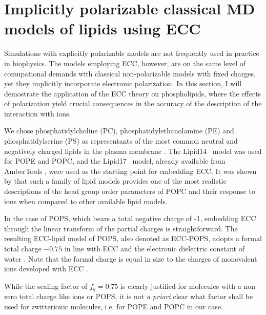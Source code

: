  

 
 



\section{Implicitly polarizable classical MD models of lipids using ECC}
\label{section:ecc-lipids}

Simulations with explicitly polarizable models are not frequently used in practice in biophysics. 
The models employing ECC, however, are on the same level of comupational demands with classical non-polarizable models with fixed charges, yet they implicitly incorporate electronic polarization. 
In this section, I will demostrate the application of the ECC theory on phospholipids, 
where the effects of polarization yield crucial consequences in the accuracy of the description of the interaction with ions. 

We chose phosphatidylcholine (PC), phosphatidylethanolamine (PE) and phosphatidylserine (PS)
as representants of the most common neutral and negatively charged lipids in the plasma membrane \citep{the_review_with_pie_charts_on_my_desk, marsh13}. 
The Lipid14~\citep{dickson14} model was used for POPE and POPC,
and the Lipid17~\citep{lipid17} model, already available from AmberTools \citep{ferrer13},
were used as the starting point for embedding ECC.
It was shown by \citet{botan15, catte16} that such a family of lipid models provides one of the most 
realistic descriptions of the head group order parameters of POPC and their response to ions 
when compared to other available lipid models. 

In the case of POPS, which bears a total negative charge of -1, 
embedding ECC through the linear transform of the partial charges is straightforward. 
The resulting ECC-lipid model of POPS, also denoted as ECC-POPS, 
adopts a formal total charge $-0.75$ in line with ECC and the electronic dielectric constant of water \citep{leontyev14}. 
Note that the formal charge is equal in size to the charges of monovalent ions developed with ECC \citep{Pluharova2014, kohagen14, kohagen16, martinek17}.

While the scaling factor of $f_q = 0.75$ is clearly justified for molecules with a non-zero total charge like ions or POPS,
it is not \emph{a priori} clear what factor shall be used for zwitterionic molecules, i.e. for POPE and POPC in our case.

